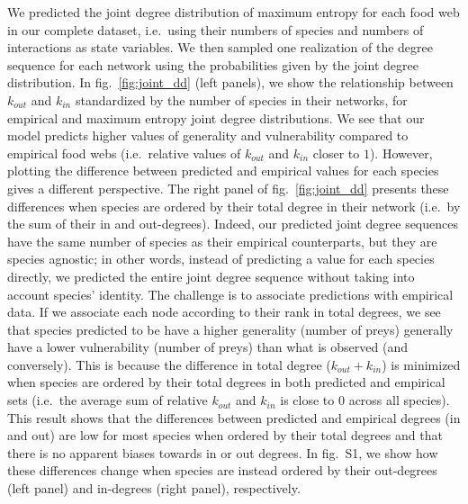 \documentclass[10pt,oneside]{article}
\begin{document}
We predicted the joint degree distribution of maximum entropy for each
food web in our complete dataset, i.e.~using their numbers of species
and numbers of interactions as state variables. We then sampled one
realization of the degree sequence for each network using the
probabilities given by the joint degree distribution. In
fig.~\ref{fig:joint_dd} (left panels), we show the relationship between
\(k_{out}\) and \(k_{in}\) standardized by the number of species in
their networks, for empirical and maximum entropy joint degree
distributions. We see that our model predicts higher values of
generality and vulnerability compared to empirical food webs
(i.e.~relative values of \(k_{out}\) and \(k_{in}\) closer to \(1\)).
However, plotting the difference between predicted and empirical values
for each species gives a different perspective. The right panel of
fig.~\ref{fig:joint_dd} presents these differences when species are
ordered by their total degree in their network (i.e.~by the sum of their
in and out-degrees). Indeed, our predicted joint degree sequences have
the same number of species as their empirical counterparts, but they are
species agnostic; in other words, instead of predicting a value for each
species directly, we predicted the entire joint degree sequence without
taking into account species' identity. The challenge is to associate
predictions with empirical data. If we associate each node according to
their rank in total degrees, we see that species predicted to be have a
higher generality (number of preys) generally have a lower vulnerability
(number of preys) than what is observed (and conversely). This is
because the difference in total degree (\(k_{out} + k_{in}\)) is
minimized when species are ordered by their total degrees in both
predicted and empirical sets (i.e.~the average sum of relative
\(k_{out}\) and \(k_{in}\) is close to \(0\) across all species). This
result shows that the differences between predicted and empirical
degrees (in and out) are low for most species when ordered by their
total degrees and that there is no apparent biases towards in or out
degrees. In fig.~S1, we show how these differences change when species
are instead ordered by their out-degrees (left panel) and in-degrees
(right panel), respectively.
\end{document}
